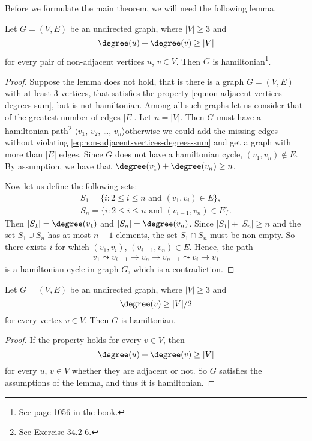 Before we formulate the main theorem, we will need the following lemma.
\begin{lemma}
    Let $G=(V,E)$ be an undirected graph, where $|V|\ge3$ and
    \begin{equation} \label{eq:non-adjacent-vertices-degrees-sum}
        \degree(u)+\degree(v) \ge |V|
    \end{equation}
    for every pair of non-adjacent vertices $u$, $v\in V$.
    Then $G$ is hamiltonian\footnote{See page 1056 in the book.}.
\end{lemma}

\begin{proof}
    Suppose the lemma does not hold, that is there is a graph $G=(V,E)$ with at least 3 vertices, that satisfies the property \eqref{eq:non-adjacent-vertices-degrees-sum}, but is not hamiltonian.
    Among all such graphs let us consider that of the greatest number of edges $|E|$.
    Let $n=|V|$.
    Then $G$ must have a hamiltonian path\footnote{See Exercise 34.2-6.} $\langle v_1$, $v_2$, \dots, $v_n\rangle$\dash otherwise we could add the missing edges without violating \eqref{eq:non-adjacent-vertices-degrees-sum} and get a graph with more than $|E|$ edges.
    Since $G$ does not have a hamiltonian cycle, $(v_1,v_n)\notin E$.
    By assumption, we have that $\degree(v_1)+\degree(v_n)\ge n$.

    Now let us define the following sets:
    \begin{gather*}
        S_1 = \{i: 2\le i\le n \text{ and } (v_1,v_i)\in E\}, \\
        S_n = \{i: 2\le i\le n \text{ and } (v_{i-1},v_n)\in E\}.
    \end{gather*}
    Then $|S_1|=\degree(v_1)$ and $|S_n|=\degree(v_n)$.
    Since $|S_1|+|S_n|\ge n$ and the set $S_1\cup S_n$ has at most $n-1$ elements, the set $S_1\cap S_n$ must be non-empty.
    So there exists $i$ for which $(v_1,v_i)$, $(v_{i-1},v_n)\in E$.
    Hence, the path
    \begin{align*}
        v_1\leadsto v_{i-1}\to v_n\to v_{n-1}\leadsto v_i\to v_1
    \end{align*}
    is a hamiltonian cycle in graph $G$, which is a contradiction.
\end{proof}

\begin{theorem}
    Let $G=(V,E)$ be an undirected graph, where $|V|\ge3$ and
    \[
        \degree(v) \ge |V|/2
    \]
    for every vertex $v\in V$.
    Then $G$ is hamiltonian.
\end{theorem}

\begin{proof}
    If the property holds for every $v\in V$, then
    \[
        \degree(u)+\degree(v) \ge |V|
    \]
    for every $u$, $v\in V$ whether they are adjacent or not.
    So $G$ satisfies the assumptions of the lemma, and thus it is hamiltonian.
\end{proof}
